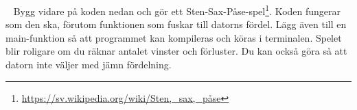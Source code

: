 %
%
%
%
%
%
%
%
%
%
%
%
%
%
%
%
%
%
%
%
%
%
%
%
%
%
%
%
%
%
%
%
%
%
%
%
%
%
%
%
%
%
%
%
%
%
%


\newpage

\AdvancedTasks %





\QUESTBEGIN

\Task  \what~ Bygg vidare på koden nedan och gör ett Sten-Sax-Påse-spel\footnote{\url{https://sv.wikipedia.org/wiki/Sten,_sax,_påse}}. Koden fungerar som den ska, förutom funktionen  som fuskar till datorns fördel. Lägg även till en main-funktion så att programmet kan kompileras och köras i terminalen. Spelet blir roligare om du räknar antalet vinster och förluster. Du kan också göra så att datorn inte väljer med jämn fördelning.

